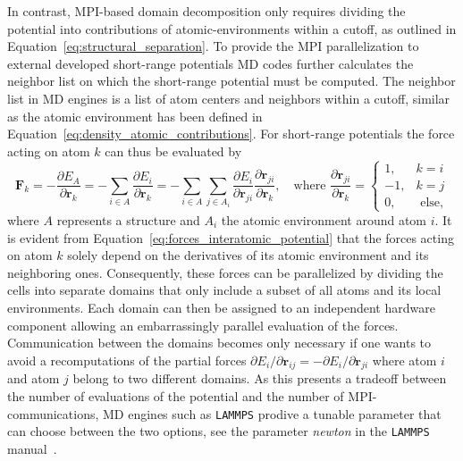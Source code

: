 In contrast, MPI-based domain decomposition only requires dividing the potential into contributions of atomic-environments within a cutoff, as outlined in Equation~\eqref{eq:structural_separation}.
To provide the MPI parallelization to external developed short-range potentials MD codes further calculates the neighbor list on which the short-range potential must be computed.
The neighbor list in MD engines is a list of atom centers and neighbors within a cutoff, similar as the atomic environment has been defined in Equation~\eqref{eq:density_atomic_contributions}.
For short-range potentials the force acting on atom $k$ can thus be evaluated by 
\begin{equation}
  \label{eq:forces_interatomic_potential}
  \mathbf{F}_k =  -\frac{\partial E_A}{\partial\mathbf{r}_k}
  = -\sum_{i\in A} \frac{\partial E_i}{\partial\mathbf{r}_k}
  = -\sum_{i\in A}\sum_{j\in A_i} \frac{\partial E_i}{\partial\mathbf{r}_{ji}} \frac{\partial\mathbf{r}_{ji}}{\partial\mathbf{r}_k}
   ,\quad\textrm{where }\frac{\partial\mathbf{r}_{ji}}{\partial\mathbf{r}_k} = \begin{cases}1,& k=i \\ -1,& k=j \\0,& \textrm{ else,} \end{cases}
\end{equation}
where $A$ represents a structure and $A_i$ the atomic environment around atom $i$.
It is evident from Equation~\eqref{eq:forces_interatomic_potential} that the forces acting on atom $k$ solely depend on the derivatives of its atomic environment and its neighboring ones.
Consequently, these forces can be parallelized by dividing the cells into separate domains that only include a subset of all atoms and its local environments.
Each domain can then be assigned to an independent hardware component allowing an embarrassingly parallel evaluation of the forces.
Communication between the domains becomes only necessary if one wants to avoid a recomputations of the partial forces $\partial E_i/\partial\mathbf{r}_{ij}=-\partial E_i/\partial\mathbf{r}_{ji}$ where atom $i$ and atom $j$ belong to two different domains.
As this presents a tradeoff between the number of evaluations of the potential and the number of MPI-communications, MD engines such as \texttt{LAMMPS} prodive a tunable parameter that can choose between the two options, see the parameter \emph{newton} in the \texttt{LAMMPS} manual~\cite{lammpsnewton}.
